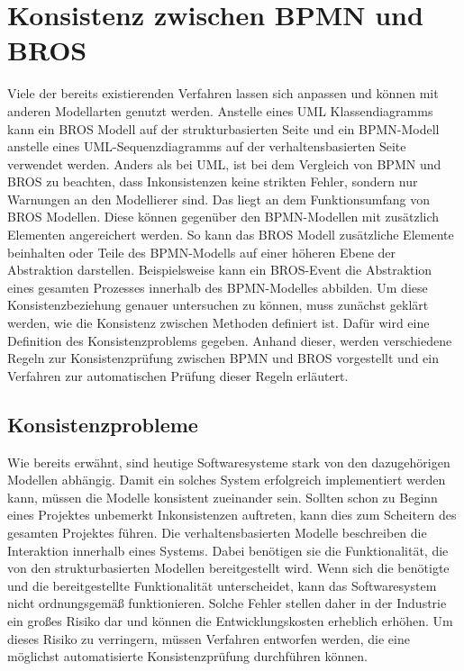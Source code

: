 \chapter{Konsistenz zwischen BPMN und BROS}
\label{chap:consistency}

Viele der bereits existierenden Verfahren lassen sich anpassen und können mit anderen Modellarten genutzt werden. 
Anstelle eines UML Klassendiagramms kann ein BROS Modell auf der strukturbasierten Seite und ein BPMN-Modell anstelle eines UML-Sequenzdiagramms auf der verhaltensbasierten Seite verwendet werden.
Anders als bei UML, ist bei dem Vergleich von BPMN und BROS zu beachten, dass Inkonsistenzen keine strikten Fehler, sondern nur Warnungen an den Modellierer sind.
Das liegt an dem Funktionsumfang von BROS Modellen.
Diese können gegenüber den BPMN-Modellen mit zusätzlich Elementen angereichert werden.
So kann das BROS Modell zusätzliche Elemente beinhalten oder Teile des BPMN-Modells auf einer höheren Ebene der Abstraktion darstellen.
Beispielsweise kann ein BROS-Event die Abstraktion eines gesamten Prozesses innerhalb des BPMN-Modelles abbilden.
Um diese Konsistenzbeziehung genauer untersuchen zu können, muss zunächst geklärt werden, wie die Konsistenz zwischen Methoden definiert ist.
Dafür wird eine Definition des Konsistenzproblems gegeben.
Anhand dieser, werden verschiedene Regeln zur Konsistenzprüfung zwischen BPMN und BROS vorgestellt und ein Verfahren zur automatischen Prüfung dieser Regeln erläutert.

\section{Konsistenzprobleme}

Wie bereits erwähnt, sind heutige Softwaresysteme stark von den dazugehörigen Modellen abhängig.
Damit ein solches System erfolgreich implementiert werden kann, müssen die Modelle konsistent zueinander sein.
Sollten schon zu Beginn eines Projektes unbemerkt Inkonsistenzen auftreten, kann dies zum Scheitern des gesamten Projektes führen.
Die verhaltensbasierten Modelle beschreiben die Interaktion innerhalb eines Systems.
Dabei benötigen sie die Funktionalität, die von den strukturbasierten Modellen bereitgestellt wird.
Wenn sich die benötigte und die bereitgestellte Funktionalität unterscheidet, kann das Softwaresystem nicht ordnungsgemäß funktionieren.
Solche Fehler stellen daher in der Industrie ein großes Risiko dar und können die Entwicklungskosten erheblich erhöhen.
Um dieses Risiko zu verringern, müssen Verfahren entworfen werden, die eine möglichst automatisierte Konsistenzprüfung durchführen können.

